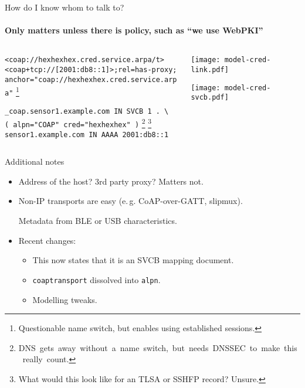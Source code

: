 \begin{frame}[fragile]{How do I know whom to talk to?}
    \framesubtitle{Only matters unless there is policy, such as ``we use WebPKI''}
    \begin{columns}
        \begin{column}{0.7\textwidth}
            \vspace{1cm}

\texttt{<coap://hexhexhex.cred.service.arpa/t>}\\
\texttt{<coap+tcp://[2001:db8::1]>;rel=has-proxy;}\\
\texttt{\qquad{}anchor="coap://hexhexhex.cred.service.arpa"}
            \footnote{Questionable name switch, but enables using established sessions.}
           
            \vspace{1cm}

\texttt{\_coap.sensor1.example.com IN SVCB 1 . \textbackslash}\\
\texttt{\qquad{}( alpn="COAP" cred="hexhexhex" )}
            \footnote{\mbox{DNS gets away without a name switch, but needs DNSSEC to make this really count.}}
            \footnote{What would this look like for an TLSA or SSHFP record? Unsure.}\\
\texttt{sensor1.example.com IN AAAA 2001:db8::1}
            \vspace{1cm}
        \end{column}
        \begin{column}{0.3\textwidth}
          \mbox{}\vspace{-1.5cm}

            \texttt{[image: model-cred-link.pdf]}

            \texttt{[image: model-cred-svcb.pdf]}
        \end{column}
    \end{columns}
\end{frame}

\begin{frame}{Additional notes}\large

    \begin{itemize}
        \item Address of the host? 3rd party proxy? Matters not.
            \bigskip
        \item Non-IP transports are easy (e.\,g. CoAP-over-GATT, slipmux).

          {\footnotesize{Metadata from BLE or USB characteristics.}}
            \bigskip
        \item  Recent changes:
        \begin{itemize}\large
            \item This now states that it is an SVCB mapping document.
            \item \texttt{coaptransport} dissolved into \texttt{alpn}.
            \item Modelling tweaks.
        \end{itemize}
    \end{itemize}
\end{frame}

